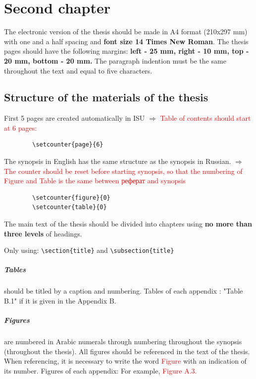 \chapter{Second chapter}
\label{ch:ch2}
The electronic version of the thesis should be made in A4 format (210x297 mm) with one and a half spacing and \textbf{font size 14 Times New Roman}.
The thesis pages should have the following margins: \textbf{left - 25 mm, right - 10 mm, top - 20 mm, bottom - 20 mm.} The paragraph indention must be the same throughout the text and equal to five characters.
\section{Structure of the materials of the thesis}\label{sec:ch2/sec1}

First 5 pages are created automatically in ISU $\Rightarrow$ \textcolor{red}{Table of contents should start at 6 pages:}
{	\color{blue}
	\begin{verbatim}
		\setcounter{page}{6}
	\end{verbatim}
}

The synopsis in English has the same structure as the synopsis in Russian.
$\Rightarrow$ \textcolor{red}{The counter should be reset before starting synopsis, so that the numbering of Figure and Table is the same  between реферат and synopsis}
{	\color{blue}
	\begin{verbatim}
		\setcounter{figure}{0}
		\setcounter{table}{0}
	\end{verbatim}
}
The main text of the thesis should be divided into chapters using \textbf{no more than three levels} of headings. 

Only using: \verb*|\section{title}| and \verb*|\subsection{title}|
\paragraph*{Tables} should be titled by a caption and numbering.
Tables of each appendix : "Table B.1" if it is given in the Appendix B. 

\paragraph*{Figures} are numbered in Arabic numerals through numbering throughout the synopsis (throughout the thesis).
All figures should be referenced in the text of the thesis. When referencing, it is necessary to write the word \textcolor{red}{Figure} with an indication of its number.
Figures of each appendix: For example, \textcolor{red}{Figure A.3.}

